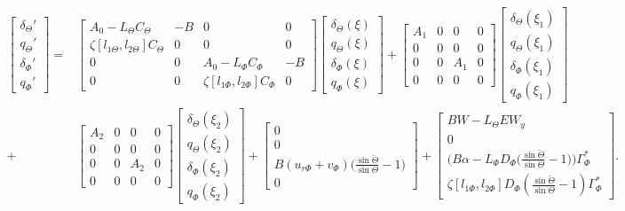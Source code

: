 \documentclass[main.tex]{subfiles}
\begin{document}
	
	\begin{align}
	\begin{bmatrix}
	\delta_\Theta' \\
	q_\Theta' \\
	\delta_\Phi' \\
	q_\Phi' 
	\end{bmatrix} =&
	\begin{bmatrix}
	A_0 - L_\Theta C_\Theta & -B & 0 & 0\\
	\zeta [l_{1\Theta},l_{2\Theta}]C_\Theta & 0 & 0 & 0 \\
	0 & 0 & A_0 - L_\Phi C_\Phi & -B \\
	0 & 0 & \zeta [l_{1\Phi},l_{2\Phi}]C_\Phi &0
	\end{bmatrix}
	\begin{bmatrix}
	\delta_\Theta(\xi) \\
	q_\Theta (\xi) \\
	\delta_\Phi(\xi) \\
	q_\Phi(\xi)
	\end{bmatrix} + 
	\begin{bmatrix}
	A_1 & 0 & 0 & 0\\
	0 & 0 & 0 & 0 \\
	0 & 0 & A_1 & 0\\
	0 & 0 & 0 & 0 
	\end{bmatrix}
	\begin{bmatrix}
	\delta_\Theta(\xi_1) \\
	q_\Theta (\xi_1) \\
	\delta_\Phi(\xi_1) \\
	q_\Phi (\xi_1)
	\end{bmatrix} \nonumber \\
	+&\begin{bmatrix}
	A_2 & 0 & 0 & 0\\
	0 & 0 & 0 & 0 \\
	0 & 0 & A_2 & 0\\
	0 & 0 & 0 & 0 
	\end{bmatrix}
	\begin{bmatrix}
	\delta_\Theta(\xi_2) \\
	q_\Theta (\xi_2) \\
	\delta_\Phi(\xi_2) \\
	q_\Phi (\xi_2)
	\end{bmatrix} + 
	\begin{bmatrix}
	0 \\
	0 \\
	B(u_{r\Phi} + v_\Phi)\big(\frac{\sin \check{\Theta}}{\sin \Theta} - 1\big) \\
	0
	\end{bmatrix}
	+
	\begin{bmatrix}
	BW - L_{\Theta}EW_y\\
	0 \\
	 \big(B\alpha  - L_\Phi D_\Phi\big(\frac{\sin \check{\Theta}}{\sin \Theta} - 1\big)\big)\Gamma_\Phi^*\\
	\zeta[l_{1\Phi},l_{2\Phi}]D_\Phi (\frac{\sin \check{\Theta}}{\sin \Theta} - 1)\Gamma_\Phi^*
	\end{bmatrix}.
	\end{align}
	
\end{document}
